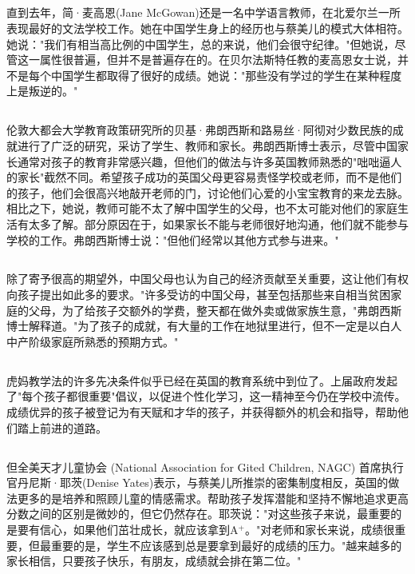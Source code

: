 \documentclass[]{article}
\begin{document}
\begin{spacing}{1.75}
{	\subsection{}
	直到去年，简·麦高恩(Jane McGowan)还是一名中学语言教师，在北爱尔兰一所表现最好的文法学校工作。她在中国学生身上的经历也与蔡美儿的模式大体相符。她说："我们有相当高比例的中国学生，总的来说，他们会很守纪律。"但她说，尽管这一属性很普遍，但并不是普遍存在的。在贝尔法斯特任教的麦高恩女士说，并不是每个中国学生都取得了很好的成绩。她说："那些没有学过的学生在某种程度上是叛逆的。"
	\subsection{}
	伦敦大都会大学教育政策研究所的贝基·弗朗西斯和路易丝·阿彻对少数民族的成就进行了广泛的研究，采访了学生、教师和家长。弗朗西斯博士表示，尽管中国家长通常对孩子的教育非常感兴趣，但他们的做法与许多英国教师熟悉的"咄咄逼人的家长"截然不同。希望孩子成功的英国父母更容易责怪学校或老师，而不是他们的孩子，他们会很高兴地敲开老师的门，讨论他们心爱的小宝宝教育的来龙去脉。相比之下，她说，教师可能不太了解中国学生的父母，也不太可能对他们的家庭生活有太多了解。部分原因在于，如果家长不能与老师很好地沟通，他们就不能参与学校的工作。弗朗西斯博士说："但他们经常以其他方式参与进来。"
	\subsection{}
	除了寄予很高的期望外，中国父母也认为自己的经济贡献至关重要，这让他们有权向孩子提出如此多的要求。"许多受访的中国父母，甚至包括那些来自相当贫困家庭的父母，为了给孩子交额外的学费，整天都在做外卖或做家族生意，"弗朗西斯博士解释道。"为了孩子的成就，有大量的工作在地狱里进行，但不一定是以白人中产阶级家庭所熟悉的预期方式。"
	\subsection{}
	虎妈教学法的许多先决条件似乎已经在英国的教育系统中到位了。上届政府发起了"每个孩子都很重要"倡议，以促进个性化学习，这一精神至今仍在学校中流传。成绩优异的孩子被登记为有天赋和才华的孩子，并获得额外的机会和指导，帮助他们踏上前进的道路。
	\subsection{}
	但全美天才儿童协会 (National Association for Gited Children, NAGC) 首席执行官丹尼斯·耶茨(Denise Yates)表示，与蔡美儿所推崇的密集制度相反，英国的做法更多的是培养和照顾儿童的情感需求。帮助孩子发挥潜能和坚持不懈地追求更高分数之间的区别是微妙的，但它仍然存在。耶茨说："对这些孩子来说，最重要的是要有信心，如果他们茁壮成长，就应该拿到A$^+$。"对老师和家长来说，成绩很重要，但最重要的是，学生不应该感到总是要拿到最好的成绩的压力。"越来越多的家长相信，只要孩子快乐，有朋友，成绩就会排在第二位。"
}
\end{spacing}
\end{document}
